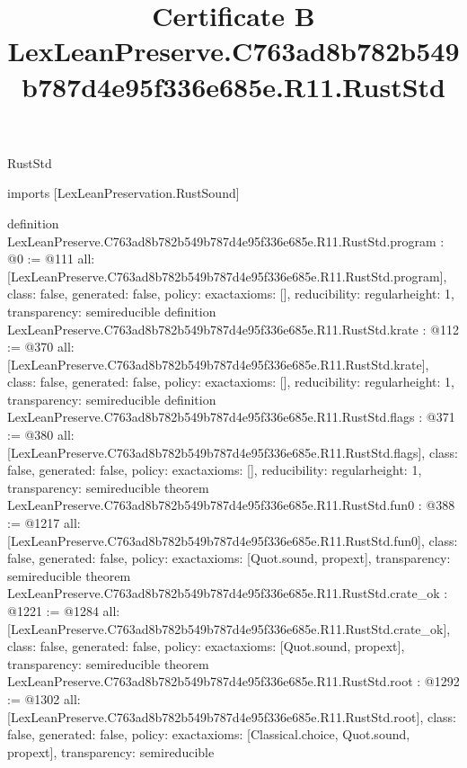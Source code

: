 \begin{lexlean}{RustStd}
\title{Certificate B LexLeanPreserve.C763ad8b782b549b787d4e95f336e685e.R11.RustStd}
\begin{coremodule}
imports [LexLeanPreservation.RustSound]

definition LexLeanPreserve.C763ad8b782b549b787d4e95f336e685e.R11.RustStd.program : @0 := @111 {
  all: [LexLeanPreserve.C763ad8b782b549b787d4e95f336e685e.R11.RustStd.program],
  class: false,
  generated: false,
  policy: exact{axioms: []},
  reducibility: regular{height: 1},
  transparency: semireducible
}
definition LexLeanPreserve.C763ad8b782b549b787d4e95f336e685e.R11.RustStd.krate : @112 := @370 {
  all: [LexLeanPreserve.C763ad8b782b549b787d4e95f336e685e.R11.RustStd.krate],
  class: false,
  generated: false,
  policy: exact{axioms: []},
  reducibility: regular{height: 1},
  transparency: semireducible
}
definition LexLeanPreserve.C763ad8b782b549b787d4e95f336e685e.R11.RustStd.flags : @371 := @380 {
  all: [LexLeanPreserve.C763ad8b782b549b787d4e95f336e685e.R11.RustStd.flags],
  class: false,
  generated: false,
  policy: exact{axioms: []},
  reducibility: regular{height: 1},
  transparency: semireducible
}
theorem LexLeanPreserve.C763ad8b782b549b787d4e95f336e685e.R11.RustStd.fun0 : @388 := @1217 {
  all: [LexLeanPreserve.C763ad8b782b549b787d4e95f336e685e.R11.RustStd.fun0],
  class: false,
  generated: false,
  policy: exact{axioms: [Quot.sound, propext]},
  transparency: semireducible
}
theorem LexLeanPreserve.C763ad8b782b549b787d4e95f336e685e.R11.RustStd.crate_ok : @1221 := @1284 {
  all: [LexLeanPreserve.C763ad8b782b549b787d4e95f336e685e.R11.RustStd.crate_ok],
  class: false,
  generated: false,
  policy: exact{axioms: [Quot.sound, propext]},
  transparency: semireducible
}
theorem LexLeanPreserve.C763ad8b782b549b787d4e95f336e685e.R11.RustStd.root : @1292 := @1302 {
  all: [LexLeanPreserve.C763ad8b782b549b787d4e95f336e685e.R11.RustStd.root],
  class: false,
  generated: false,
  policy: exact{axioms: [Classical.choice, Quot.sound, propext]},
  transparency: semireducible
}


\end{coremodule}
\end{lexlean}
